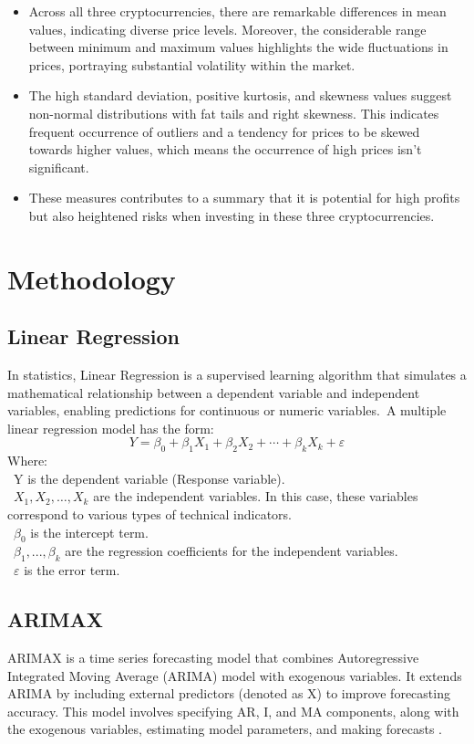 \documentclass{ieeeojies}
\begin{document}
\begin{itemize}
    \item Across all three cryptocurrencies, there are remarkable differences in mean values, indicating diverse price levels. Moreover, the considerable range between minimum and maximum values highlights the wide fluctuations in prices, portraying substantial volatility within the market.
    \item The high standard deviation, positive kurtosis, and skewness values suggest non-normal distributions with fat tails and right skewness. This indicates frequent occurrence of outliers and a tendency for prices to be skewed towards higher values, which means the occurrence of high prices isn't significant.
    \item These measures contributes to a summary that it is potential for high profits but also heightened risks when investing in these three cryptocurrencies.

\end{itemize}

\section{Methodology}
\subsection{Linear Regression}
In statistics, Linear Regression is a supervised learning algorithm that simulates a mathematical relationship between a dependent variable and independent
variables, enabling predictions for continuous or numeric variables.\
A multiple linear regression model has the form:
\[Y=\beta_0+\beta_1X_1+\beta_2X_2+\cdots+\beta_kX_k+\varepsilon\]
Where:\\
\indent\textbullet\ Y is the dependent variable (Response variable).\\
\indent\textbullet\ \(X_1, X_2, \ldots, X_k\) are the independent variables. In this case, these variables correspond to various types of technical indicators. \\
\indent\textbullet\ \(\beta_0\) is the intercept term.\\
\indent\textbullet\ \(\beta_1,..., \beta_k\) are the regression coefficients for the independent variables.\\
\indent\textbullet\ \(\varepsilon\) is the error term.
\subsection{ARIMAX}
\justify
ARIMAX is a time series forecasting model that combines Autoregressive Integrated Moving Average (ARIMA) model with exogenous variables. It extends  ARIMA by  including external  predictors  (denoted as  X) to improve  forecasting accuracy.  This model involves  specifying AR, I,  and MA components,  along with the  exogenous variables, estimating model parameters, and making forecasts \cite{b3}.\\
\end{document}
